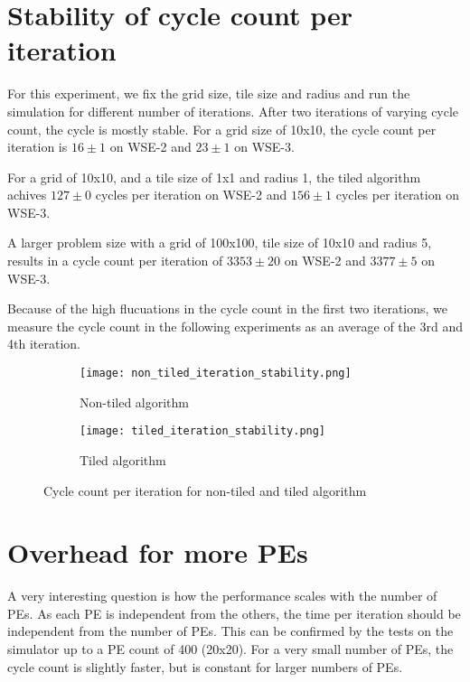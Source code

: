 \section{Stability of cycle count per iteration}
For this experiment, we fix the grid size, tile size and radius and run the simulation for different number of iterations.
After two iterations of varying cycle count, the cycle is mostly stable.
For a grid size of 10x10, the cycle count per iteration is $16\pm1$ on WSE-2 and $23\pm1$ on WSE-3.

For a grid of 10x10, and a tile size of 1x1 and radius 1, the tiled algorithm achives $127\pm0$ cycles per iteration on WSE-2 and $156\pm1$ cycles per iteration on WSE-3.

A larger problem size with a grid of 100x100, tile size of 10x10 and radius 5, results in a cycle count per iteration of $3353\pm20$ on WSE-2 and $3377\pm5$ on WSE-3.

Because of the high flucuations in the cycle count in the first two iterations, we measure the cycle count in the following experiments as an average of the 3rd and 4th iteration.

\begin{figure}[h]
    \centering
    \begin{subfigure}[b]{0.48\textwidth}
        \centering
        \texttt{[image: non\_tiled\_iteration\_stability.png]}
        \caption{Non-tiled algorithm}
        \label{fig:non_tiled_iteration_stability}
    \end{subfigure}
    \hfill
    \begin{subfigure}[b]{0.48\textwidth}
        \centering
        \texttt{[image: tiled\_iteration\_stability.png]}
        \caption{Tiled algorithm}
        \label{fig:tiled_iteration_stability}
    \end{subfigure}
    \caption{Cycle count per iteration for non-tiled and tiled algorithm}
    \label{fig:iteration_stability}
\end{figure}

\section{Overhead for more PEs}
A very interesting question is how the performance scales with the number of PEs.
As each PE is independent from the others, the time per iteration should be independent from the number of PEs.
This can be confirmed by the tests on the simulator up to a PE count of 400 (20x20).
For a very small number of PEs, the cycle count is slightly faster, but is constant for larger numbers of PEs.

